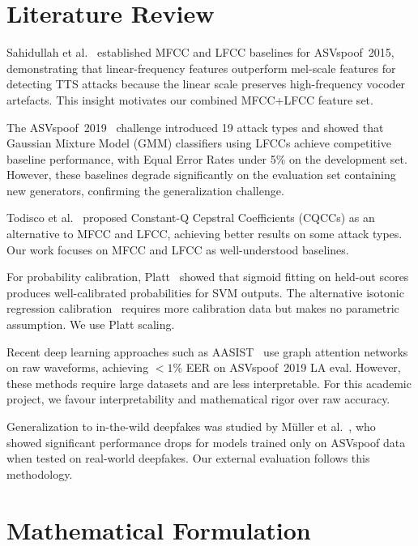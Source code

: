 \documentclass[conference]{IEEEtran}
\begin{document}
\section{Literature Review}
\label{sec:literature}

Sahidullah et al.~\cite{sahidullah2015} established MFCC and LFCC baselines for
ASVspoof~2015, demonstrating that linear-frequency features outperform mel-scale
features for detecting TTS attacks because the linear scale preserves high-frequency
vocoder artefacts. This insight motivates our combined MFCC+LFCC feature set.

The ASVspoof~2019~\cite{asvspoof2019} challenge introduced 19 attack types and showed
that Gaussian Mixture Model (GMM) classifiers using LFCCs achieve competitive baseline
performance, with Equal Error Rates under 5\% on the development set. However, these
baselines degrade significantly on the evaluation set containing new generators,
confirming the generalization challenge.

Todisco et al.~\cite{todisco2016} proposed Constant-Q Cepstral Coefficients (CQCCs)
as an alternative to MFCC and LFCC, achieving better results on some attack types.
Our work focuses on MFCC and LFCC as well-understood baselines.

For probability calibration, Platt~\cite{platt1999} showed that sigmoid fitting
on held-out scores produces well-calibrated probabilities for SVM outputs. The
alternative isotonic regression calibration~\cite{niculescu2005} requires more
calibration data but makes no parametric assumption. We use Platt scaling.

Recent deep learning approaches such as AASIST~\cite{jung2022aasist} use graph
attention networks on raw waveforms, achieving $<1\%$ EER on ASVspoof~2019 LA eval.
However, these methods require large datasets and are less interpretable. For this
academic project, we favour interpretability and mathematical rigor over raw accuracy.

Generalization to in-the-wild deepfakes was studied by M\"{u}ller et al.~\cite{muller2022},
who showed significant performance drops for models trained only on ASVspoof data
when tested on real-world deepfakes. Our external evaluation follows this methodology.

\section{Mathematical Formulation}
\label{sec:math}
\end{document}
